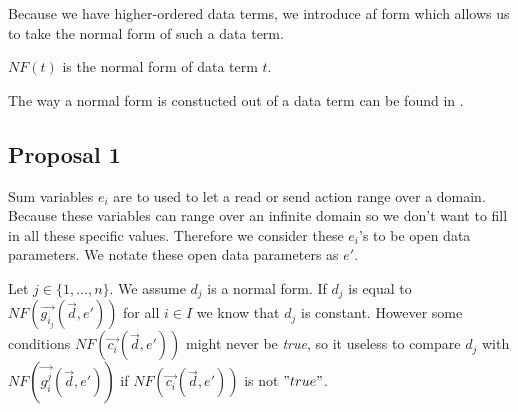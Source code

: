 \documentclass[a4paper,10pt]{article}
\theoremstyle{plain}
\theoremstyle{definition}
\newcommand{\lpe}{linear process equation}
\newcommand{\ovr}{\overrightarrow}
\newcommand{\pp}{process parameter}
\newcommand{\pps}{process parameters}
\newcommand{\ti}{\textit}
\begin{document}
Because we have  higher-ordered data terms, we introduce af form which allows us to take the normal form of such a data term. 
\begin{defn} 
$NF(t)$ is the normal form of data term $t$. 
\end{defn}
The way a normal form is constucted out of a data term can be found in \cite{rewrite}.





\subsection{Proposal 1} \label{sec:prop1}
Sum variables $e_i$ are to used to let a read or send action range over a domain. Because these variables can range over an infinite domain so we don't want to fill in all these specific values. Therefore we consider these $e_i$'s to be open data parameters. We notate these open data parameters as $e'$.

Let $j \in \lbrace 1, \ldots,  n \rbrace $. We assume $d_j$ is a normal form. If $d_j$ is equal to $NF(\ovr{g_{i_j}}(\ovr{d},e'))$ for all $i \in I$ we know that $d_j$ is constant. However some conditions $NF(\ovr{c_i}(\ovr{d},e'))$ might never be \ti{true}, so it useless to compare $d_j$ with $NF(\ovr{g_i^j}(\ovr{d},e'))$  if $NF(\ovr{c_i}(\ovr{d},e'))$ is not  $"true"$. \\
\end{document}
